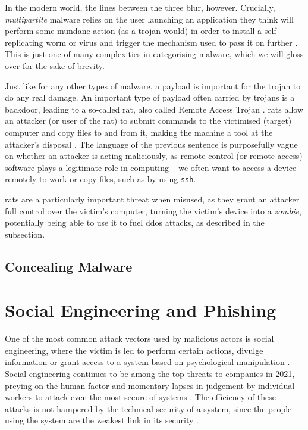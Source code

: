 In the modern world, the lines between the three blur, however. Crucially, \emph{multipartite} malware relies on the
user launching an application they think will perform some mundane action (as a trojan would) in order to install a
self-replicating worm or virus and trigger the mechanism used to pass it on further \cite{viruses-revealed-book}. This
is just one of many complexities in categorising malware, which we will gloss over for the sake of brevity.

Just like for any other types of malware, a payload is important for the trojan to do any real damage. An important type
of payload often carried by trojans is a backdoor, leading to a so-called \acrfull{rat}, also called Remote Access Trojan 
\cite{viruses-revealed-book}. \acrshort{rat}s allow an attacker (or user of the \acrshort{rat}) to submit commands to
the victimised (target) computer and copy files to and from it, making the machine a tool at the attacker's disposal
\cite{viruses-revealed-book}. The language of the previous sentence is purposefully vague on whether an attacker
is acting maliciously, as remote control (or remote access) software plays a legitimate role in computing -- we often
want to access a device remotely to work or copy files, such as by using \verb+ssh+.

\acrshort{rat}s are a particularly important threat when misused, as they grant an attacker full control over the
victim's computer, turning the victim's device into a \emph{zombie}, potentially being able to use it to fuel
\acrshort{ddos} attacks, as described in the  subsection.

\subsection{Concealing Malware}

\section{Social Engineering and Phishing}
One of the most common attack vectors used by malicious actors is social engineering, 
where the victim is led to perform certain actions, divulge information or grant access to a 
system based on psychological manipulation \cite{advanced-social-engineering-attacks, covid19-social-engineering}. 
Social engineering continues to be among the top threats to companies in 2021, preying on the human
factor and momentary lapses in judgement by individual workers to attack even the most secure of systems
\cite{verizon_2021}. 
The efficiency of these attacks is not hampered by the technical security of a system,
since the people using the system are the weakest link in its security \cite{advanced-social-engineering-attacks,
social-engineering-attacks}.

